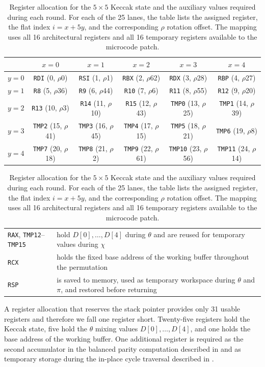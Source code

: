 \documentclass[journal=tches,submission]{iacrtrans}
\newcommand{\code}[1]{\texttt{#1}}
\begin{document}
\begin{table}[htbp]
\centering
\small
\setlength{\tabcolsep}{5pt}
\begin{tabular}{@{}c|ccccc@{}}
\toprule
 & $x = 0$ & $x = 1$ & $x = 2$ & $x = 3$ & $x = 4$ \\
\midrule
$y = 0$ & \code{RDI} (0, $\rho$0)  & \code{RSI} (1, $\rho$1)   & \code{RBX} (2, $\rho$62)  & \code{RDX} (3, $\rho$28)  & \code{RBP} (4, $\rho$27) \\
$y = 1$ & \code{R8} (5, $\rho$36)  & \code{R9} (6, $\rho$44)   & \code{R10} (7, $\rho$6)   & \code{R11} (8, $\rho$55)  & \code{R12} (9, $\rho$20) \\
$y = 2$ & \code{R13} (10, $\rho$3) & \code{R14} (11, $\rho$10) & \code{R15} (12, $\rho$43) & \code{TMP0} (13, $\rho$25) & \code{TMP1} (14, $\rho$39) \\
$y = 3$ & \code{TMP2} (15, $\rho$41) & \code{TMP3} (16, $\rho$45) & \code{TMP4} (17, $\rho$15) & \code{TMP5} (18, $\rho$21) & \code{TMP6} (19, $\rho$8) \\
$y = 4$ & \code{TMP7} (20, $\rho$18) & \code{TMP8} (21, $\rho$2) & \code{TMP9} (22, $\rho$61) & \code{TMP10} (23, $\rho$56) & \code{TMP11} (24, $\rho$14) \\
\bottomrule
\end{tabular}

\vspace{4pt}
\begin{tabularx}{\linewidth}{@{}lX@{}}
\toprule
\code{RAX}, \code{TMP12}--\code{TMP15}
& hold $D[0],\ldots,D[4]$ during $\theta$ and are reused for temporary values during $\chi$ \\
\code{RCX}
& holds the fixed base address of the working buffer throughout the permutation \\
\code{RSP}
& is saved to memory, used as temporary workspace during $\theta$ and $\pi$, and restored before returning \\
\bottomrule
\end{tabularx}
\caption{Register allocation for the $5\times5$ Keccak state and the auxiliary values required during each round. For each of the 25 lanes, the table lists the assigned register, the flat index $i=x+5y$, and the corresponding $\rho$ rotation offset. The mapping uses all 16 architectural registers and all 16 temporary registers available to the microcode patch.}
\label{tab:regmap}
\end{table}

A register allocation that reserves the stack pointer provides only 31 usable registers and therefore we fall one register short.
Twenty-five registers hold the Keccak state, five hold the $\theta$ mixing values $D[0],\ldots,D[4]$, and one holds the base address of the working buffer.
One additional register is required as the second accumulator in the balanced parity computation described in  and as temporary storage during the in-place cycle traversal described in .
\end{document}
